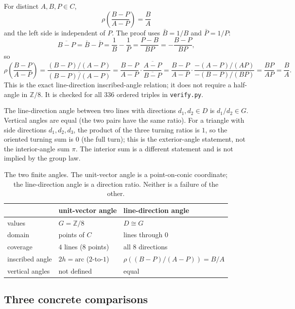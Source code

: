 \documentclass[11pt]{article}
\theoremstyle{definition}
\theoremstyle{remark}
\newcommand{\Z}{\mathbb{Z}}
\begin{document}
For distinct $A,B,P\in C$,
\begin{equation}\label{eq:line-inscribed}
  \boxed{\quad
  \rho\!\left(\frac{B-P}{A-P}\right)=\frac BA
  \quad}
\end{equation}
and the left side is independent of $P$.  The proof uses $\bar B=1/B$ and
$\bar P=1/P$:
\[
  \overline{B-P}=\bar B-\bar P=\frac1B-\frac1P
  =\frac{P-B}{BP}=-\frac{B-P}{BP},
\]
so
\[
  \rho\!\left(\frac{B-P}{A-P}\right)
  =\frac{(B-P)/(A-P)}{\overline{(B-P)/(A-P)}}
  =\frac{B-P}{A-P}\cdot\frac{\overline{A-P}}{\overline{B-P}}
  =\frac{B-P}{A-P}\cdot\frac{-(A-P)/(AP)}{-(B-P)/(BP)}
  =\frac{BP}{AP}=\frac BA .
\]
This is the exact line-direction inscribed-angle relation; it does not require
a half-angle in $\Z/8$.  It is checked for all $336$ ordered triples in
\texttt{verify.py}.

The line-direction angle between two lines with directions $d_1,d_2\in D$ is
$d_1/d_2\in G$.  Vertical angles are equal (the two pairs have the same ratio).
For a triangle with side directions $d_1,d_2,d_3$, the product of the three
turning ratios is $1$, so the oriented turning sum is $0$ (the full turn); this
is the exterior-angle statement, not the interior-angle sum $\pi$.  The
interior sum is a different statement and is not implied by the group law.

\begin{table}[htbp]
\centering
\small
\begin{tabular}{@{}lll@{}}
\toprule
 & unit-vector angle & line-direction angle\\
\midrule
values & $G=\Z/8$ & $D\cong G$\\
domain & points of $C$ & lines through $0$\\
coverage & $4$ lines ($8$ points) & all $8$ directions\\
inscribed angle & $2h=\text{arc}$ ($2$-to-$1$) & $\rho((B-P)/(A-P))=B/A$\\
vertical angles & not defined & equal\\
\bottomrule
\end{tabular}
\caption{The two finite angles.  The unit-vector angle is a point-on-conic
coordinate; the line-direction angle is a direction ratio.  Neither is a
failure of the other.}
\label{tab:angle-types}
\end{table}

\subsection{Three concrete comparisons}
\end{document}
